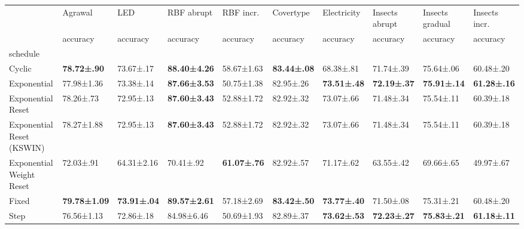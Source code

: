 \begin{tabular}{llllllllll}
\toprule
 & Agrawal & LED & RBF abrupt & RBF incr. & Covertype & Electricity & Insects abrupt & Insects gradual & Insects incr. \\
 & accuracy & accuracy & accuracy & accuracy & accuracy & accuracy & accuracy & accuracy & accuracy \\
schedule &  &  &  &  &  &  &  &  &  \\
\midrule
Cyclic & \bfseries 78.72±.90 & 73.67±.17 & \bfseries 88.40±4.26 & 58.67±1.63 & \bfseries 83.44±.08 & 68.38±.81 & 71.74±.39 & 75.64±.06 & 60.48±.20 \\
Exponential & 77.98±1.36 & 73.38±.14 & \bfseries 87.66±3.53 & 50.75±1.38 & 82.95±.26 & \bfseries 73.51±.48 & \bfseries 72.19±.37 & \bfseries 75.91±.14 & \bfseries 61.28±.16 \\
Exponential Reset & 78.26±.73 & 72.95±.13 & \bfseries 87.60±3.43 & 52.88±1.72 & 82.92±.32 & 73.07±.66 & 71.48±.34 & 75.54±.11 & 60.39±.18 \\
Exponential Reset (KSWIN) & 78.27±1.88 & 72.95±.13 & \bfseries 87.60±3.43 & 52.88±1.72 & 82.92±.32 & 73.07±.66 & 71.48±.34 & 75.54±.11 & 60.39±.18 \\
Exponential Weight Reset & 72.03±.91 & 64.31±2.16 & 70.41±.92 & \bfseries 61.07±.76 & 82.92±.57 & 71.17±.62 & 63.55±.42 & 69.66±.65 & 49.97±.67 \\
Fixed & \bfseries 79.78±1.09 & \bfseries 73.91±.04 & \bfseries 89.57±2.61 & 57.18±2.69 & \bfseries 83.42±.50 & \bfseries 73.77±.40 & 71.50±.08 & 75.31±.21 & 60.48±.20 \\
Step & 76.56±1.13 & 72.86±.18 & 84.98±6.46 & 50.69±1.93 & 82.89±.37 & \bfseries 73.62±.53 & \bfseries 72.23±.27 & \bfseries 75.83±.21 & \bfseries 61.18±.11 \\
\bottomrule
\end{tabular}
